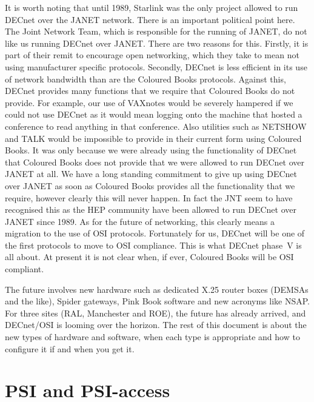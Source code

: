 It is worth noting that until 1989, Starlink was the only project allowed to
run DECnet over the JANET network. There is an important political point here.
The Joint Network Team, which is responsible for the running of JANET, do not
like us running DECnet over JANET. There are two reasons for this. Firstly, it
is part of their remit to encourage open networking, which they take to mean
not using manufacturer specific protocols. Secondly, DECnet is less efficient
in its use of network bandwidth than are the Coloured Books protocols. Against
this, DECnet provides many functions that we require that Coloured Books do not
provide. For example, our use of VAXnotes would be severely hampered if we
could not use DECnet as it would mean logging onto the machine that hosted a
conference to read anything in that conference. Also utilities such as NETSHOW
and TALK would be impossible to provide in their current form using Coloured
Books. It was only because we were already using the functionality of DECnet
that Coloured Books does not provide that we were allowed to run DECnet over
JANET at all. We have a long standing commitment to give up using DECnet over
JANET as soon as Coloured Books provides all the functionality that we require,
however clearly this will never happen. In fact the JNT seem to have recognised
this as the HEP community have been allowed to run DECnet over JANET since
1989. As for the future of networking, this clearly means a migration to the
use of OSI protocols. Fortunately for us, DECnet will be one of the first
protocols to move to OSI compliance. This is what DECnet phase~V is all about.
At present it is not clear when, if ever, Coloured Books will be OSI compliant.

The future involves new hardware such as dedicated X.25 router boxes (DEMSAs
and the like), Spider gateways, Pink Book software and new acronyms like NSAP.
For three sites (RAL, Manchester and ROE), the future has already arrived, and
DECnet/OSI is looming over the horizon. The rest of this document is about the
new types of hardware and software, when each type is appropriate and how to
configure it if and when you get it.

\section{PSI and PSI-access}

